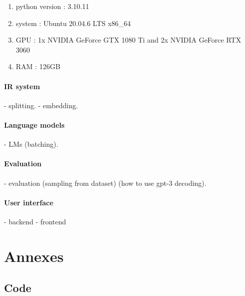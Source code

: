 \documentclass[a4paper,12pt]{article}
\begin{document}
\begin{enumerate}
  \item python version : 3.10.11
  \item system : Ubuntu 20.04.6 LTS x86\_64
  \item GPU : 1x NVIDIA GeForce GTX 1080 Ti and 2x NVIDIA GeForce RTX 3060
  \item RAM : 126GB
\end{enumerate}

\paragraph*{IR system}
- splitting.
- embedding.
\paragraph*{Language models}
- LMs (batching).
\paragraph*{Evaluation}
- evaluation (sampling from dataset) (how to use gpt-3 decoding).
\paragraph*{User interface}
- backend 
- frontend

\twocolumn


\clearpage










\onecolumn
\section{Annexes}

\subsection{Code}
\end{document}
